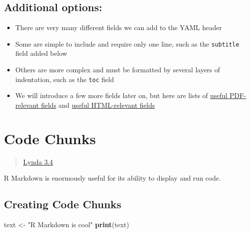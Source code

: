 \documentclass[]{article}
\newenvironment{Shaded}{\begin{snugshade}}{\end{snugshade}}
\newcommand{\KeywordTok}[1]{\textcolor[rgb]{0.13,0.29,0.53}{\textbf{#1}}}
\newcommand{\NormalTok}[1]{#1}
\newcommand{\StringTok}[1]{\textcolor[rgb]{0.31,0.60,0.02}{#1}}
\providecommand{\tightlist}{%
  \setlength{\itemsep}{0pt}\setlength{\parskip}{0pt}}
\begin{document}
\hypertarget{additional-options}{%
\subsection{Additional options:}\label{additional-options}}

\begin{itemize}
\tightlist
\item
  There are very many different fields we can add to the YAML header
\item
  Some are simple to include and require only one line, such as the
  \texttt{subtitle} field added below
\item
  Others are more complex and must be formatted by several layers of
  indentation, such as the \texttt{toc} field
\end{itemize}

\begin{itemize}
\tightlist
\item
  We will introduce a few more fields later on, but here are lists of
  \href{https://bookdown.org/yihui/rmarkdown/pdf-document.html}{useful
  PDF-relevant fields} and
  \href{https://bookdown.org/yihui/rmarkdown/html-document.html}{useful
  HTML-relevant fields}
\end{itemize}

\hypertarget{code-chunks}{%
\section{Code Chunks}\label{code-chunks}}

\begin{quote}
\href{https://www.lynda.com/RStudio-tutorials/Code-chunks-global-code-chunk-settings/699348/2800212-4.html?srchtrk=index\%3a1\%0alinktypeid\%3a2\%0aq\%3ar+markdown\%0apage\%3a1\%0as\%3arelevance\%0asa\%3atrue\%0aproducttypeid\%3a2}{Lynda
3.4}
\end{quote}

R Markdown is enormously useful for its ability to display and run code.

\hypertarget{creating-code-chunks}{%
\subsection{Creating Code Chunks}\label{creating-code-chunks}}

\begin{Shaded}
\begin{Highlighting}[]
\NormalTok{text <-}\StringTok{ "R Markdown is cool"}
\KeywordTok{print}\NormalTok{(text)}
\end{Highlighting}
\end{Shaded}
\end{document}
